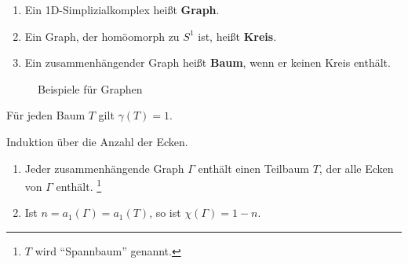 \begin{definition}
    \begin{enumerate}[label=\alph*),ref=\theplaindefinition.\alph*]
        \item Ein 1D-Simplizialkomplex heißt \textbf{Graph}.
        \item Ein Graph, der homöomorph zu $S^1$ ist, heißt \textbf{Kreis}.
        \item Ein zusammenhängender Graph heißt \textbf{Baum},
              wenn er keinen Kreis enthält.
    \end{enumerate}
\end{definition}

\begin{figure}[ht]
    \centering

    \subfloat[$K_5$]{
        \parbox{4cm}{\centering}
        \label{fig:k-5}
    }%
    \subfloat[$K_{3,3}$]{
        \parbox{4cm}{\centering}
        \label{fig:k-3-3}
    }%
    \label{fig:graphen-beispiele}
    \caption{Beispiele für Graphen}
\end{figure}

\begin{korollar}
    Für jeden Baum $T$ gilt $\gamma(T) = 1$.
\end{korollar}

\begin{beweis}
    Induktion über die Anzahl der Ecken.
\end{beweis}

\begin{korollar}
    \begin{enumerate}[label=\alph*),ref=\theplaindefinition.\alph*]
        \item Jeder zusammenhängende Graph $\Gamma$ enthält einen
              Teilbaum $T$, der alle Ecken von $\Gamma$ enthält.%
              \footnote{$T$ wird \enquote{Spannbaum} genannt.}
        \item Ist $n = a_1(\Gamma) = a_1(T)$, so ist $\chi(\Gamma) = 1 - n$.
    \end{enumerate}
\end{korollar}

